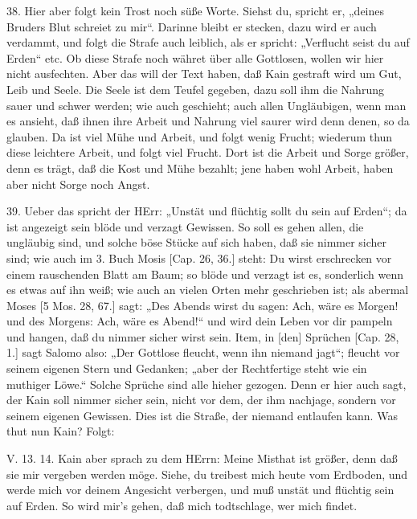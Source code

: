 38. Hier aber folgt kein Trost noch süße Worte. Siehst du, spricht er, „deines Bruders Blut schreiet zu mir“. Darinne bleibt er stecken, dazu wird er auch verdammt, und folgt die Strafe auch leiblich, als er spricht: „Verflucht seist du auf Erden“ etc. Ob diese Strafe noch währet über alle Gottlosen, wollen wir hier nicht ausfechten. Aber das will der Text haben, daß Kain gestraft wird um Gut, Leib und Seele. Die Seele ist dem Teufel gegeben, dazu soll ihm die Nahrung sauer und schwer werden; wie auch
geschieht; auch allen Ungläubigen, wenn man es ansieht, daß ihnen ihre Arbeit und Nahrung viel saurer wird denn denen, so da glauben. Da ist viel Mühe und Arbeit, und folgt wenig Frucht; wiederum thun diese leichtere Arbeit, und folgt viel Frucht. Dort ist die Arbeit und Sorge größer, denn es trägt, daß die Kost und Mühe bezahlt; jene haben wohl Arbeit, haben aber nicht Sorge noch Angst.

39. Ueber das spricht der HErr: „Unstät und flüchtig sollt du sein auf Erden“; da ist angezeigt sein blöde und verzagt Gewissen. So soll es gehen allen, die ungläubig sind, und solche böse Stücke auf sich haben, daß sie nimmer sicher sind; wie auch im 3. Buch Mosis [Cap. 26, 36.] steht: Du wirst erschrecken vor einem rauschenden Blatt am Baum; so blöde und verzagt ist es, sonderlich wenn es etwas auf ihn weiß; wie auch an vielen Orten mehr geschrieben ist; als abermal Moses [5 Mos. 28, 67.] sagt: „Des Abends wirst du sagen: Ach, wäre es Morgen! und des Morgens: Ach, wäre es Abend!“ und wird dein Leben vor dir pampeln und hangen, daß du nimmer sicher wirst sein. Item, in [den] Sprüchen [Cap. 28, 1.] sagt Salomo also: „Der Gottlose fleucht, wenn ihn niemand jagt“; fleucht vor seinem eigenen Stern und Gedanken; „aber der Rechtfertige steht wie ein muthiger Löwe.“ Solche Sprüche sind alle hieher gezogen. Denn er hier auch sagt, der Kain soll nimmer sicher sein, nicht vor dem, der ihm nachjage, sondern vor seinem eigenen Gewissen. Dies ist die Straße, der niemand entlaufen kann. Was thut nun Kain? Folgt:

\begin{schriftzitat}
V. 13. 14. Kain aber sprach zu dem HErrn: Meine Misthat ist größer, denn daß sie mir vergeben werden möge. Siehe, du treibest mich heute vom Erdboden, und werde mich vor deinem Angesicht verbergen, und muß unstät und flüchtig sein auf Erden. So wird mir’s gehen, daß mich todtschlage, wer mich findet.
\end{schriftzitat}

